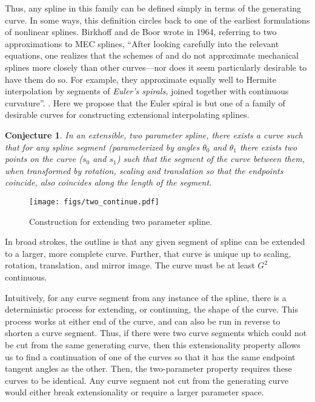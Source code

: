 \documentclass{article}
\begin{document}
Thus, any spline in this family can be defined simply in terms of the
generating curve. In some ways, this definition circles back to one of
the earliest formulations of nonlinear splines. Birkhoff and de Boor
wrote in 1964, referring to two approximations to MEC splines, ``After
looking carefully into the relevant equations, one realizes that the
schemes of \cite{MacLaren58} and \cite{Fowler62} do not approximate
mechanical splines more closely than other curves---nor does it seem
particularly desirable to have them do so. For example, they
approximate equally well to Hermite interpolation by segments of
\emph{Euler's spirals,} joined together with continuous
curvature''. \cite[p. 171]{Birkhoff65}. Here we propose that the
Euler spiral is but one of a family of desirable curves for
constructing extensional interpolating splines.

\newtheorem{conjecture}{Conjecture}
\begin{conjecture}
In an extensible, two parameter spline, there exists a curve such that
for any spline segment (parameterized by angles $\theta_0$ and
$\theta_1$ there exists two points on the curve ($s_0$ and $s_1$) such
that the segment of the curve between them, when transformed by rotation,
scaling and translation so that the endpoints coincide, also coincides
along the length of the segment.
\end{conjecture}

\begin{figure*}[tbh]
\begin{center}
\texttt{[image: figs/two\_continue.pdf]}
\caption{\label{two-continue}Construction for extending two parameter spline.}
\end{center}
\end{figure*}

In broad strokes, the outline is that any given segment of spline can
be extended to a larger, more complete curve. Further, that curve is
unique up to scaling, rotation, translation, and mirror image. The
curve must be at least $G^2$ continuous.

Intuitively, for any curve segment from any instance of the spline,
there is a deterministic process for extending, or continuing, the
shape of the curve. This process works at either end of the curve, and
can also be run in reverse to shorten a curve segment. Thus, if there
were two curve segments which could not be cut from the same
generating curve, then this extensionality property allows us to
find a continuation of one of the curves so that it has the same
endpoint tangent angles as the other. Then, the two-parameter property
requires these curves to be identical. Any curve segment not cut from
the generating curve would either break extensionality or require a
larger parameter space.
\end{document}
